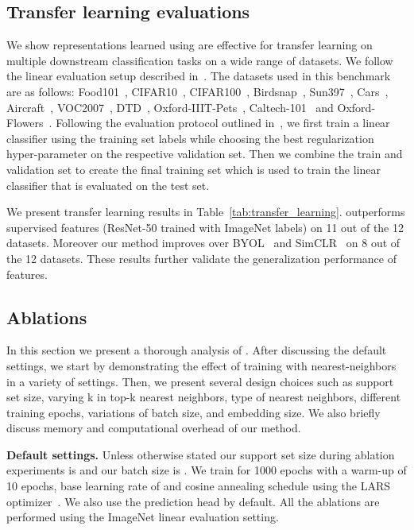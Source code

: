\subsection{Transfer learning evaluations}
\label{sec:transfer_learning}
We show representations learned using \methodname are effective for transfer learning on multiple downstream classification tasks on a wide range of datasets. We follow the linear evaluation setup described in~\cite{grill2020bootstrap}. The datasets used in this benchmark are as follows: Food101~\cite{bossard14}, CIFAR10~\cite{Krizhevsky09learningmultiple}, CIFAR100~\cite{Krizhevsky09learningmultiple}, Birdsnap~\cite{berg-birdsnap-cvpr2014}, Sun397~\cite{Xiao:2010}, Cars~\cite{KrauseStarkDengFei-Fei_3DRR2013}, Aircraft~\cite{maji13fine-grained}, VOC2007~\cite{pascal-voc-2007}, DTD~\cite{cimpoi14describing}, Oxford-IIIT-Pets~\cite{parkhi12a}, Caltech-101~\cite{FeiFei2004LearningGV} and Oxford-Flowers~\cite{Nilsback08}. Following the evaluation protocol outlined in~\cite{grill2020bootstrap}, we first train a linear classifier using the training set labels while choosing the best regularization hyper-parameter on the respective validation set. Then we combine the train and validation set to create the final training set which is used to train the linear classifier that is evaluated on the test set. 

We present transfer learning results in Table~\ref{tab:transfer_learning}. \methodname outperforms supervised features (ResNet-50 trained with ImageNet labels) on 11 out of the 12 datasets. Moreover our method improves over BYOL~\cite{grill2020bootstrap} and SimCLR~\cite{chen2020simple} on 8 out of the 12 datasets. These results further validate the generalization performance of \methodname features.

\subsection{Ablations}
\label{sec:ablations}
In this section we present a thorough analysis of \methodname. 
After discussing the default settings, we start by demonstrating the effect of training with nearest-neighbors in a variety of settings. 
Then, we present several design choices such as support set size, varying k in top-k nearest neighbors, type of nearest neighbors, different training epochs, variations of batch size, and embedding size. 
We also briefly discuss memory and computational overhead of our method.

\noindent \textbf{Default settings.} Unless otherwise stated our support set size during ablation experiments is  and our batch size is .  
We train for 1000 epochs with a warm-up of 10 epochs, base learning rate of  and cosine annealing schedule using the LARS optimizer~\cite{you2017large}. We also use the prediction head by default. All the ablations are performed using the ImageNet linear evaluation setting.


